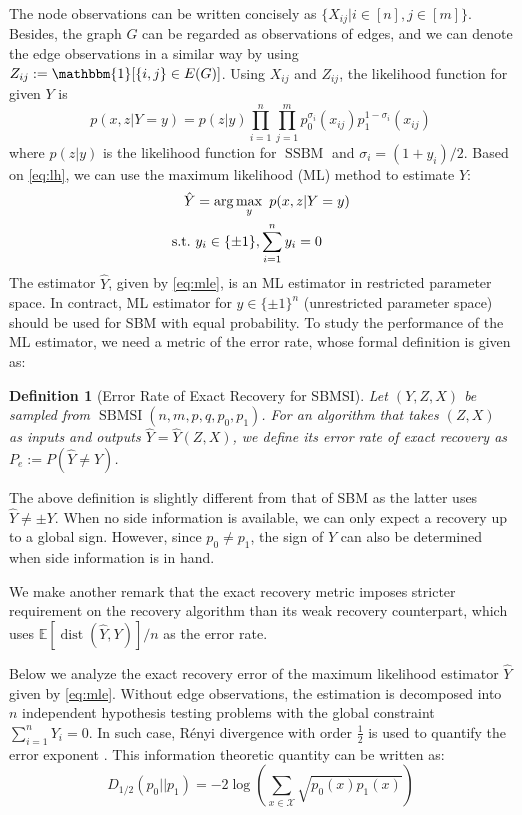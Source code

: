 \documentclass[conference,letterpaper]{IEEEtran}
\newtheorem{definition}{Definition}
\DeclareMathOperator{\SSBM}{SSBM}
\DeclareMathOperator{\SBMSI}{SBMSI}
\DeclareMathOperator{\dist}{dist}
\begin{document}
The node observations can be written concisely as $\{X_{ij} | i \in [n], j \in [m]\}$. Besides, the graph $G$ can be regarded as observations of edges, and
we can denote the edge observations in a similar way by using $Z_{ij}:=\mathbbm{1}[\{i,j\} \in E(G)]$.
Using $X_{ij}$ and $Z_{ij}$, the likelihood function for
given $Y$ is
\begin{equation}\label{eq:lh}
    p(x, z| Y=y) = p(z|y)\prod_{i=1}^n \prod_{j=1}^m p^{\sigma_i}_0(x_{ij})p^{1-\sigma_i}_1(x_{ij}) 
\end{equation}
where $p(z|y)$ is the likelihood function for $\SSBM$ and $\sigma_i = (1+y_i)/2$.
Based on \eqref{eq:lh}, we can use the maximum likelihood (ML) method to estimate
$Y$:
\begin{align}
    \hat{Y} &= \arg\max_y\ p(x,z|Y=y) \notag \\
    \textrm{s.t.} \ & y_i \in \{\pm 1\}, \sum_{i=1}^n y_i=0 \label{eq:mle}
\end{align}
The estimator $\hat{Y}$, given by \eqref{eq:mle}, is an ML estimator in restricted parameter space.
In contract,
ML estimator for $y\in \{ \pm 1 \}^n$ (unrestricted parameter space)
should be used for SBM with equal probability.
To study the performance of the ML estimator, we need a metric of the error rate,
whose formal definition is given as:
\begin{definition}[Error Rate of Exact Recovery for SBMSI]
		Let $(Y,Z,X)$ be sampled from $\SBMSI(n,m,p,q,p_0, p_1)$.
		For an algorithm that takes $(Z,X)$ as inputs and outputs $\hat{Y}=\hat{Y}(Z,X)$,
		we define its error rate of exact recovery as
		$P_e:=P(\hat{Y} \neq Y)$.
\end{definition}
The above definition is slightly different from that of SBM as the latter uses $\hat{Y} \neq \pm Y$.
When no side information is available, we can only expect a recovery up to a global sign. However,
since $p_0 \neq p_1$, the sign of $Y$ can also be determined when side information is in hand.

We make another remark that the exact recovery metric imposes stricter requirement on the recovery algorithm than its weak recovery
counterpart, which uses $\mathbb{E}[\dist(\hat{Y}, Y)]/n$ as the error rate.

Below we analyze the exact recovery error of the maximum likelihood estimator $\hat{Y}$
given by \eqref{eq:mle}.
Without edge observations, the estimation is decomposed into $n$
independent hypothesis testing problems with the global constraint $\sum_{i=1}^n Y_i=0$. 
In such case, Rényi divergence with order $\frac{1}{2}$
is used to quantify the error exponent \cite{gao2018community}.
This information theoretic quantity can be written as:
\begin{equation}
D_{1/2}(p_0 || p_1) = -2\log(\sum_{x \in \mathcal{X}} \sqrt{p_0(x)p_1(x)} )
\end{equation}
\end{document}
